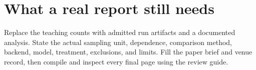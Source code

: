 \documentclass[10pt]{article}
\begin{document}
\section{What a real report still needs}
Replace the teaching counts with admitted run artifacts and a documented
analysis. State the actual sampling unit, dependence, comparison method,
backend, model, treatment, exclusions, and limits. Fill the paper brief and
venue record, then compile and inspect every final page using the review guide.
\end{document}
